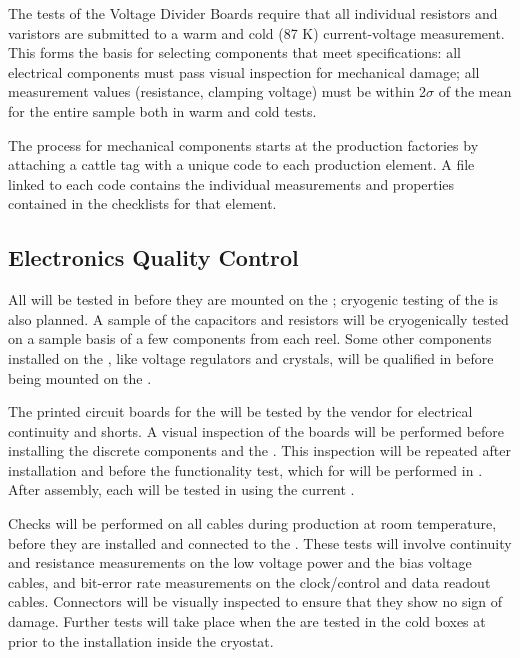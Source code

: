 The  tests of the Voltage Divider Boards require that all
individual resistors and varistors are submitted to a warm and cold
(87 K) current-voltage measurement. This forms the basis for selecting
components that meet specifications: all electrical components must
pass visual inspection for mechanical damage; all measurement values
(resistance, clamping voltage) must be within 2$\sigma$ of the mean for the
entire sample both in warm and cold tests.

The  process for mechanical components starts at the production
factories by attaching a cattle tag with a unique code to each
production element. A file linked to each code contains the individual
measurements and properties contained in the  checklists for that
element.

\subsection{ Electronics Quality Control}

All  will be tested in  before they are mounted
on the ; cryogenic testing of the  is also
planned.  A sample of the capacitors and resistors will be
cryogenically tested on a sample basis of a few components from each
reel. Some other components installed on the , like
voltage regulators and crystals, will be qualified in 
before being mounted on the .

The printed circuit boards for the  will be tested by the
vendor for electrical continuity and shorts. A visual inspection of
the boards will be performed before installing the discrete components
and the . This inspection will be repeated after
installation and before the functionality test, which for 
will be performed in .  After assembly, each 
will be tested in  using the current .

Checks will be performed on all cables during production at room
temperature, before they are installed and connected to the
. These tests will involve continuity and resistance
measurements on the low voltage power and the bias voltage cables, and
bit-error rate measurements on the clock/control and data readout
cables. Connectors will be visually inspected to ensure that they show
no sign of damage. Further tests will take place when the 
are tested in the cold boxes at  prior to the installation
inside the cryostat.

